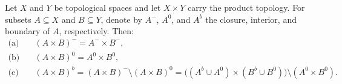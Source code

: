 Let $X$ and $Y$ be topological spaces and let $X \times Y$ carry the product topology. For subsets $A \subseteq X$ and $B \subseteq Y$, denote by $A^{-}$, $A^{0}$, and $A^{b}$ the closure, interior, and boundary of $A$, respectively. Then:
\begin{align*}
\text{(a)} &\quad (A \times B)^{-} = A^{-} \times B^{-}, \\[4pt]
\text{(b)} &\quad (A \times B)^{0} = A^{0} \times B^{0}, \\[4pt]
\text{(c)} &\quad (A \times B)^{b} = (A \times B)^{-} \setminus (A \times B)^{0}
= \bigl( (A^{b} \cup A^{0}) \times (B^{b} \cup B^{0}) \bigr) \setminus (A^{0} \times B^{0}).
\end{align*}
